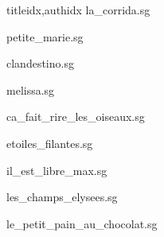 \documentclass[
    ]{article}
\begin{document}
\begin{songs}{titleidx,authidx}
{la_corrida.sg}


{petite_marie.sg}


{clandestino.sg}


{melissa.sg}


{ca_fait_rire_les_oiseaux.sg}


{etoiles_filantes.sg}


{il_est_libre_max.sg}


{les_champs_elysees.sg}


{le_petit_pain_au_chocolat.sg}



\end{songs}
\end{document}
